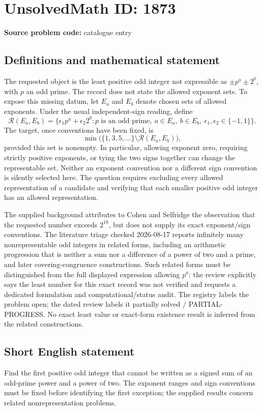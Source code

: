 \documentclass[11pt]{article}
\begin{document}
\section*{UnsolvedMath ID: 1873}
\textbf{Source problem code:} catalogue entry
\subsection{Definitions and mathematical statement}
The requested object is the least positive odd integer not expressible as $\pm p^a\pm2^b$, with $p$ an odd prime. The record does not state the allowed exponent sets. To expose this missing datum, let $E_a$ and $E_b$ denote chosen sets of allowed exponents. Under the usual independent-sign reading, define
\[\mathcal R(E_a,E_b)=\{\epsilon_1p^a+\epsilon_2 2^b:p\text{ is an odd prime},\ a\in E_a,\ b\in E_b,\ \epsilon_1,\epsilon_2\in\{-1,1\}\}.\]
The target, once conventions have been fixed, is
\[\min\bigl(\{1,3,5,\ldots\}\setminus\mathcal R(E_a,E_b)\bigr),\]
provided this set is nonempty. In particular, allowing exponent zero, requiring strictly positive exponents, or tying the two signs together can change the representable set. Neither an exponent convention nor a different sign convention is silently selected here. The question requires excluding every allowed representation of a candidate and verifying that each smaller positive odd integer has an allowed representation.

The supplied background attributes to Cohen and Selfridge the observation that the requested number exceeds $2^{18}$, but does not supply its exact exponent/sign conventions. The literature triage checked 2026-08-17 reports infinitely many nonrepresentable odd integers in related forms, including an arithmetic progression that is neither a sum nor a difference of a power of two and a prime, and later covering-congruence constructions. Such related forms must be distinguished from the full displayed expression allowing $p^a$: the review explicitly says the least number for this exact record was not verified and requests a dedicated formulation and computational/status audit. The registry labels the problem open; the dated review labels it partially solved / PARTIAL-PROGRESS. No exact least value or exact-form existence result is inferred from the related constructions.
\subsection{Short English statement}
Find the first positive odd integer that cannot be written as a signed sum of an odd-prime power and a power of two. The exponent ranges and sign conventions must be fixed before identifying the first exception; the supplied results concern related nonrepresentation problems.
\end{document}
